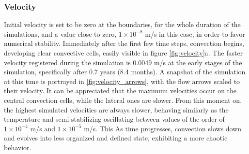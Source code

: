 \subsubsection{Velocity}
Initial velocity is set to be zero at the boundaries, for the whole duration of the simulations, and a value close to zero, $1\times10^{-8}$ m/s in this case, in order to favor numerical stability. Immediately after the first few time steps, convection begins, developing clear convective cells, easily visible in figure \ref{fig:velocity}a. The faster velocity registered during the simulation is 0.0049 m/s at the early stages of the simulation, specifically after 0.7 years (8.4 months). A snapshot of the simulation at this time is portrayed in \ref{fig:velocity_arrows}, with the flow arrows scaled to their velocity. It can be appreciated that the maximum velocities occur on the central convection cells, while the lateral ones are slower.  From this moment on, the highest simulated velocities are always slower, behaving similarly as the temperature and semi-stabilizing oscillating between values of the order of  $1\times10^{-4}$ m/s and $1\times10^{-5}$ m/s. This 
As time progresses, convection slows down and evolves into less organized and defined state, exhibiting a more chaotic behavior.

